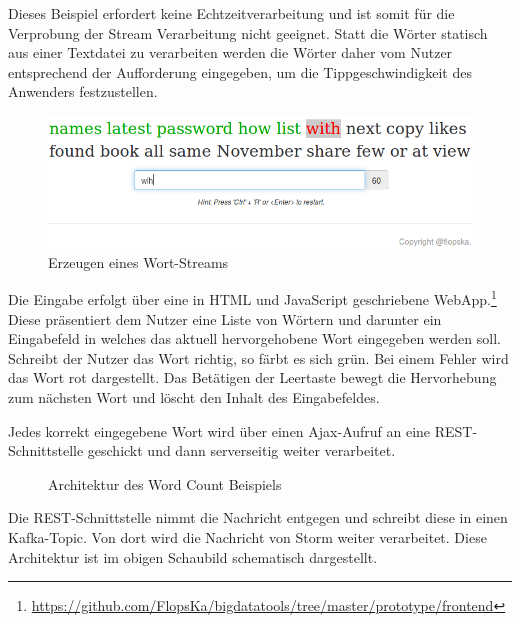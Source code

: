 \documentclass[a4paper,11pt]{scrartcl}
\begin{document}
  Dieses Beispiel erfordert keine Echtzeitverarbeitung und ist somit
  für die Verprobung der Stream Verarbeitung nicht geeignet. Statt die
  Wörter statisch aus einer Textdatei zu verarbeiten werden die Wörter
  daher vom Nutzer entsprechend der Aufforderung eingegeben, um die
  Tippgeschwindigkeit des Anwenders festzustellen.

  \begin{figure}[!h]
    \centering
    \includegraphics[scale=0.4,natwidth=750,natheight=234]{../presentation/img/webapp.png}
    \caption{Erzeugen eines Wort-Streams\protect\footnotemark}
  \end{figure}


  Die Eingabe erfolgt über eine in HTML und JavaScript geschriebene
  WebApp.\footnote{\url{https://github.com/FlopsKa/bigdatatools/tree/master/prototype/frontend}}
  Diese präsentiert dem Nutzer eine Liste von Wörtern und darunter ein
  Eingabefeld in welches das aktuell hervorgehobene Wort eingegeben werden
  soll. Schreibt der Nutzer das Wort richtig, so färbt es sich grün. Bei einem
  Fehler wird das Wort rot dargestellt.  Das Betätigen der Leertaste bewegt die
  Hervorhebung zum nächsten Wort und löscht den Inhalt des Eingabefeldes.

  Jedes korrekt eingegebene Wort wird über einen Ajax-Aufruf an eine
  REST-Schnittstelle geschickt und dann serverseitig weiter
  verarbeitet.

  \begin{figure}[!h]
    \center
    \scalebox{.7}{}
    \caption{Architektur des Word Count Beispiels}
    \label{fig:wordcountsamplearchitecture}
  \end{figure}

  Die REST-Schnittstelle nimmt die Nachricht entgegen und schreibt
  diese in einen Kafka-Topic. Von dort wird die Nachricht von Storm
  weiter verarbeitet. Diese Architektur ist im obigen Schaubild
  schematisch dargestellt.
\end{document}
